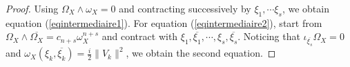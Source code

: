 \documentclass[10pt,a4paper]{amsart}
\begin{document}
\begin{proof}
    Using $\Omega_X\wedge\omega_X=0$ and contracting successively by $\xi_1,\cdots\xi_s$, we obtain equation (\ref{eqintermediaire1}). For equation  (\ref{eqintermediaire2}), start from $\Omega_X\wedge\overline{\Omega_X}=c_{n+s}\omega_X^{n+s}$ and contract with $\xi_1,\overline{\xi_1},\cdots,\xi_s,\overline{\xi_s}$. Noticing that $\iota_{\overline{\xi_s}}\Omega_X=0$ and $\omega_X(\xi_k,\overline{\xi_k})=\frac{i}{2}\|V_k\|^2$, we obtain the second equation.
\end{proof}
\end{document}
